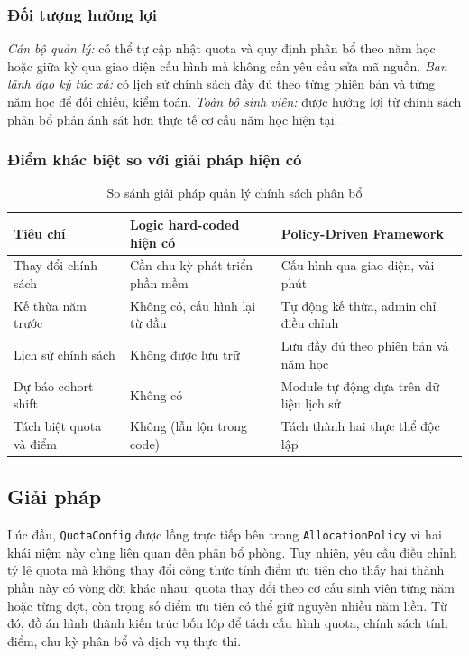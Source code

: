 \documentclass[../DoAn.tex]{subfiles}
\begin{document}
\subsubsection{Đối tượng hưởng lợi}

\textit{Cán bộ quản lý:} có thể tự cập nhật quota và quy định phân bổ theo
năm học hoặc giữa kỳ qua giao diện cấu hình mà không cần yêu cầu sửa mã nguồn.
\textit{Ban lãnh đạo ký túc xá:} có lịch sử chính sách đầy đủ theo từng phiên
bản và từng năm học để đối chiếu, kiểm toán. \textit{Toàn bộ sinh viên:} được
hưởng lợi từ chính sách phân bổ phản ánh sát hơn thực tế cơ cấu năm học hiện
tại.

\subsubsection{Điểm khác biệt so với giải pháp hiện có}

\begin{table}[H]
\centering
\caption{So sánh giải pháp quản lý chính sách phân bổ}
\label{tab:policy_comparison}
\small
\begin{tabular}{|p{3.5cm}|p{4.5cm}|p{4.8cm}|}
\hline
\textbf{Tiêu chí} & \textbf{Logic hard-coded hiện có} & \textbf{Policy-Driven Framework} \\
\hline
Thay đổi chính sách & Cần chu kỳ phát triển phần mềm & Cấu hình qua giao diện, vài phút \\
\hline
Kế thừa năm trước & Không có, cấu hình lại từ đầu & Tự động kế thừa, admin chỉ điều chỉnh \\
\hline
Lịch sử chính sách & Không được lưu trữ & Lưu đầy đủ theo phiên bản và năm học \\
\hline
Dự báo cohort shift & Không có & Module tự động dựa trên dữ liệu lịch sử \\
\hline
Tách biệt quota và điểm & Không (lẫn lộn trong code) & Tách thành hai thực thể độc lập \\
\hline
\end{tabular}
\end{table}

\subsection{Giải pháp}
\label{subsec:policy_arch}

Lúc đầu, \texttt{QuotaConfig} được lồng trực tiếp bên trong
\texttt{AllocationPolicy} vì hai khái niệm này cùng liên quan đến phân bổ
phòng. Tuy nhiên, yêu cầu điều chỉnh tỷ lệ quota mà không thay đổi công thức
tính điểm ưu tiên cho thấy hai thành phần này có vòng đời khác nhau: quota
thay đổi theo cơ cấu sinh viên từng năm hoặc từng đợt, còn trọng số điểm ưu
tiên có thể giữ nguyên nhiều năm liền. Từ đó, đồ án hình thành kiến trúc bốn
lớp để tách cấu hình quota, chính sách tính điểm, chu kỳ phân bổ và dịch vụ
thực thi.
\end{document}
